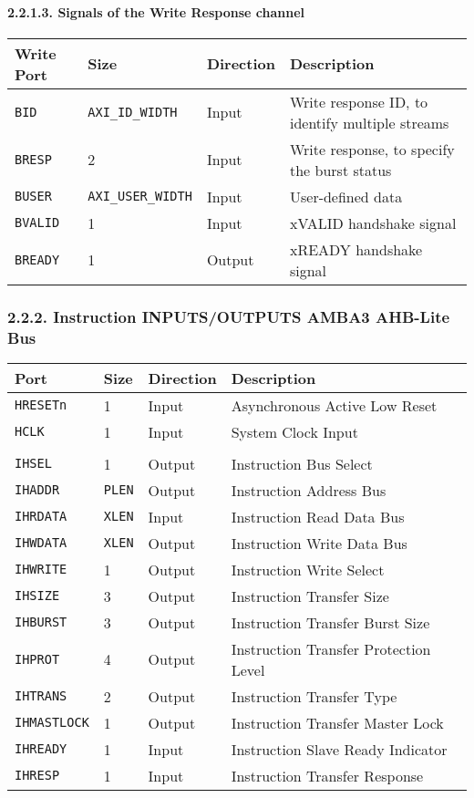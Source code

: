 \documentclass[]{article}
\let\oldparagraph\paragraph
\renewcommand{\paragraph}[1]{\oldparagraph{#1}\mbox{}}
\begin{document}
\paragraph{2.2.1.3. Signals of the Write Response
channel}\label{signals-of-the-write-response-channel}

\begin{longtable}[]{@{}llll@{}}
\toprule
Write Port & Size & Direction & Description\tabularnewline
\midrule
\endhead
\texttt{BID} & \texttt{AXI\_ID\_WIDTH} & Input & Write response ID, to
identify multiple streams\tabularnewline
\texttt{BRESP} & 2 & Input & Write response, to specify the burst
status\tabularnewline
\texttt{BUSER} & \texttt{AXI\_USER\_WIDTH} & Input & User-defined
data\tabularnewline
\texttt{BVALID} & 1 & Input & xVALID handshake signal\tabularnewline
\texttt{BREADY} & 1 & Output & xREADY handshake signal\tabularnewline
\bottomrule
\end{longtable}

\subsubsection{2.2.2. Instruction INPUTS/OUTPUTS AMBA3 AHB-Lite
Bus}\label{instruction-inputsoutputs-amba3-ahb-lite-bus}

\begin{longtable}[]{@{}llll@{}}
\toprule
Port & Size & Direction & Description\tabularnewline
\midrule
\endhead
\texttt{HRESETn} & 1 & Input & Asynchronous Active Low
Reset\tabularnewline
\texttt{HCLK} & 1 & Input & System Clock Input\tabularnewline
& & &\tabularnewline
\texttt{IHSEL} & 1 & Output & Instruction Bus Select\tabularnewline
\texttt{IHADDR} & \texttt{PLEN} & Output & Instruction Address
Bus\tabularnewline
\texttt{IHRDATA} & \texttt{XLEN} & Input & Instruction Read Data
Bus\tabularnewline
\texttt{IHWDATA} & \texttt{XLEN} & Output & Instruction Write Data
Bus\tabularnewline
\texttt{IHWRITE} & 1 & Output & Instruction Write Select\tabularnewline
\texttt{IHSIZE} & 3 & Output & Instruction Transfer Size\tabularnewline
\texttt{IHBURST} & 3 & Output & Instruction Transfer Burst
Size\tabularnewline
\texttt{IHPROT} & 4 & Output & Instruction Transfer Protection
Level\tabularnewline
\texttt{IHTRANS} & 2 & Output & Instruction Transfer Type\tabularnewline
\texttt{IHMASTLOCK} & 1 & Output & Instruction Transfer Master
Lock\tabularnewline
\texttt{IHREADY} & 1 & Input & Instruction Slave Ready
Indicator\tabularnewline
\texttt{IHRESP} & 1 & Input & Instruction Transfer
Response\tabularnewline
\bottomrule
\end{longtable}
\end{document}
